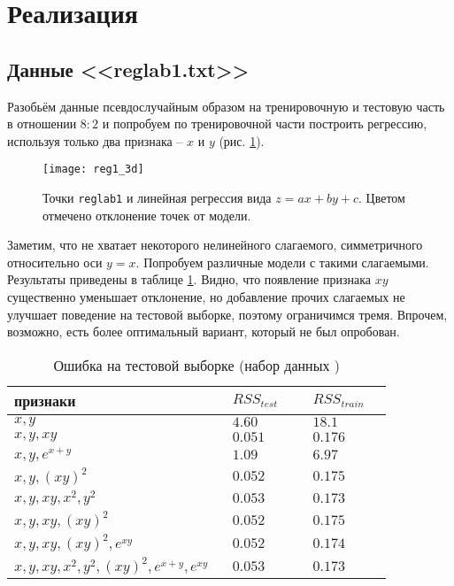 \documentclass[a4paper,12pt]{article} %
\newcommand{\myPictWidth}{.95\textwidth}
\begin{document}
\newpage
\section{Реализация}
\subsection{Данные <<reglab1.txt>>}

Разобьём данные псевдослучайным образом на тренировочную и тестовую часть в отношении $8:2$ и попробуем по тренировочной части построить регрессию, используя только два признака -- $x$ и $y$ (рис. \ref{fig:reg1}).

\begin{figure}[H]
    \centering \texttt{[image: reg1\_3d]}
    \caption{Точки \texttt{reglab1} и линейная регрессия вида $ z = ax + by + c $. Цветом отмечено отклонение точек от модели.}
    \label{fig:reg1}
\end{figure}

Заметим, что не хватает некоторого нелинейного слагаемого, симметричного относительно оси $ y = x $. Попробуем различные модели с такими слагаемыми. Результаты приведены в таблице \ref{table:reg1}.
Видно, что появление признака $ xy $ существенно уменьшает отклонение, но добавление прочих слагаемых не улучшает поведение на тестовой выборке, поэтому ограничимся тремя.
Впрочем, возможно, есть более оптимальный вариант, который не был опробован.

\begin{table}[H]
    \caption{Ошибка на тестовой выборке (набор данных )}
    \begin{tabular}{m{0.45\linewidth} | m{0.2\linewidth} | m{0.2\linewidth}}
        \hline \hline
        признаки & $ RSS_{test} $ & $ RSS_{train} $ \\
        \hline
        $ x, y $ & $ 4.60 $ & $ 18.1 $ \\
        $ x, y, xy $ & $ 0.051 $ & $ 0.176$ \\
        $ x, y, e^{x + y}  $ & $ 1.09 $ & $ 6.97 $ \\
        $ x, y, (xy)^2 $ & $ 0.052 $ & $ 0.175 $ \\
        $ x, y, xy, x^2, y^2 $ & $ 0.053 $ & $ 0.173 $ \\
        $ x, y, xy, (xy)^2 $ & $ 0.052 $ & $ 0.175 $ \\
        $ x, y, xy, (xy)^2, e^{xy} $ & $ 0.052 $ & $ 0.174 $ \\
        $ x, y, xy, x^2, y^2, (xy)^2, e^{x+y}, e^{xy}  $ & $ 0.053 $ & $ 0.173 $ \\
        \hline
    \end{tabular}
    \label{table:reg1}
\end{table}
\end{document}
